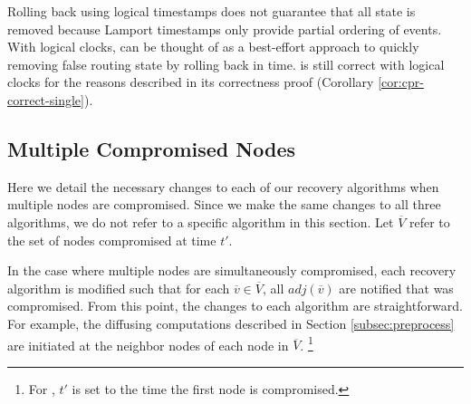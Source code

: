 Rolling back using logical timestamps does not guarantee that all \badvector state is removed because Lamport timestamps only provide partial ordering of events. 
With logical clocks, \cpr can be thought of as a best-effort approach to quickly removing false routing state by rolling back in time.  \cpr is still correct with logical clocks
for the reasons described in its correctness proof (Corollary \ref{cor:cpr-correct-single}).  




\subsection{Multiple Compromised Nodes}
\label{subsec:mult}

Here we detail the necessary changes to each of our recovery algorithms when multiple nodes are compromised. Since we make the same changes to all three algorithms, we do not refer 
to a specific algorithm in this section. Let $\overline{V}$ refer to the set of nodes compromised at time $t'$. 

In the case where multiple nodes are simultaneously compromised, each recovery algorithm is modified such that for each $\overline{v} \in \overline{V}$, all $adj(\overline{v})$
are notified that \bad was compromised. 
From this point, the changes to each algorithm are straightforward.  For example,
the diffusing computations described in Section  \ref{subsec:preprocess} are initiated at the neighbor nodes of each node in $\overline{V}$.
{\footnote {\small For \cprs, $t'$ is set to the time the first node is compromised.}}

